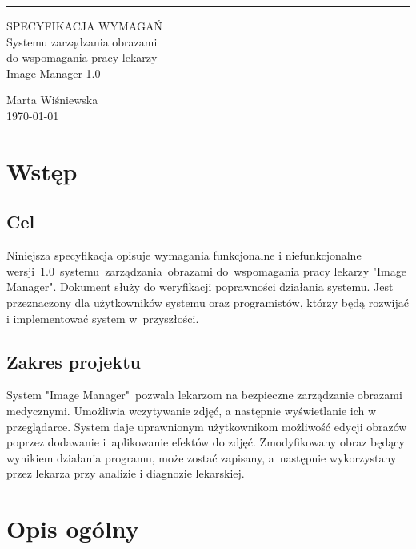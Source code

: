 \documentclass{scrreprt}
\date{}
\begin{document}
\begin{flushright}
    \rule{16cm}{5pt}\vskip1cm
    \begin{bfseries}
        \Huge{SPECYFIKACJA WYMAGAŃ}\\
        \vspace{1.9cm}
       Systemu zarządzania obrazami \\ do wspomagania pracy lekarzy \\  Image Manager 1.0\\
        \vspace{8.9cm}
 \end{bfseries}
        \Huge{{Marta Wi\'sniewska}}\\
        \vspace{1.9cm}
        \today\\
   
\end{flushright}

\tableofcontents

\chapter{Wstęp}
\section{Cel}
Niniejsza specyfikacja opisuje wymagania funkcjonalne i niefunkcjonalne wersji~1.0~systemu~zarządzania~obrazami do~wspomagania pracy lekarzy "Image Manager". Dokument służy do weryfikacji poprawno\'sci działania systemu. Jest przeznaczony dla użytkowników systemu oraz programistów, którzy będą rozwijać i implementować system w~przyszło\'sci.
\section{Zakres projektu}
System "Image Manager"~pozwala lekarzom na bezpieczne zarządzanie obrazami medycznymi. Umożliwia wczytywanie zdjęć, a następnie wy\'swietlanie ich w przeglądarce. System daje uprawnionym użytkownikom możliwo\'sć edycji obrazów poprzez dodawanie i~aplikowanie efektów do zdjęć. Zmodyfikowany obraz będący wynikiem działania programu, może zostać zapisany, a~następnie wykorzystany przez lekarza przy analizie i diagnozie lekarskiej.
\chapter{Opis ogólny}
\end{document}
